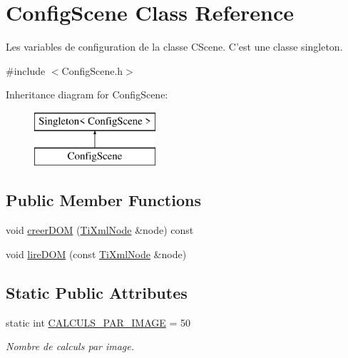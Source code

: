 \hypertarget{class_config_scene}{\section{Config\-Scene Class Reference}
\label{class_config_scene}
}


Les variables de configuration de la classe C\-Scene. C'est une classe singleton.  




{\ttfamily \#include $<$Config\-Scene.\-h$>$}

Inheritance diagram for Config\-Scene\-:\begin{figure}[H]
\begin{center}
\leavevmode
\includegraphics[height=2.000000cm]{class_config_scene}
\end{center}
\end{figure}
\subsection*{Public Member Functions}
\begin{DoxyCompactItemize}
\item 
void \hyperlink{group__inf2990_gad74111f597fd4d2f58a08c6dedcb4270}{creer\-D\-O\-M} (\hyperlink{class_ti_xml_node}{Ti\-Xml\-Node} \&node) const 
\item 
void \hyperlink{group__inf2990_gaa29c1518d06292658bfd90d3c6d379d3}{lire\-D\-O\-M} (const \hyperlink{class_ti_xml_node}{Ti\-Xml\-Node} \&node)
\end{DoxyCompactItemize}
\subsection*{Static Public Attributes}
\begin{DoxyCompactItemize}
\item 
\hypertarget{group__inf2990_gadb487b450a0314a5d1f75cf31ce502eb}{static int \hyperlink{group__inf2990_gadb487b450a0314a5d1f75cf31ce502eb}{C\-A\-L\-C\-U\-L\-S\-\_\-\-P\-A\-R\-\_\-\-I\-M\-A\-G\-E} = 50}\label{group__inf2990_gadb487b450a0314a5d1f75cf31ce502eb}

\begin{DoxyCompactList}\small\item\em Nombre de calculs par image. \end{DoxyCompactList}\end{DoxyCompactItemize}
